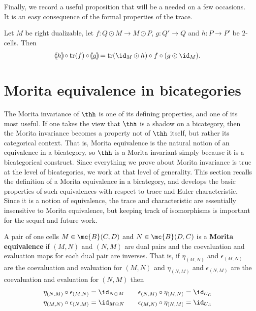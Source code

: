\documentclass[11pt]{amsart}
\DeclareMathOperator{\tr}{tr}
\def\shvar#1#2{{\ensuremath{%
  \hspace{1mm}\makebox[-1mm]{$#1\langle$}\makebox[0mm]{$#1\langle$}\hspace{1mm}%
  {#2}%
  \makebox[1mm]{$#1\rangle$}\makebox[0mm]{$#1\rangle$}%
}}}
\def\sh{\shvar{}}
\begin{document}
Finally, we record a useful proposition that will be a needed on a few occasions. It is an easy consequence of the formal properties of the trace. 

\begin{prop}\label{prop:tightening}\cite[Prop.~7.1]{ps:bicat} 
Let $M$ be right dualizable, let $f \colon  Q\odot M \to M \odot P$, $g\colon  Q' \to Q$ and $h\colon P \to P'$ be 2-cells. Then
\[
\sh{h}\circ \tr(f)\circ\sh{g}=\tr (\id_M \odot h)\circ f\circ (g\odot \id_M).
\]
\end{prop}

\section{Morita equivalence in bicategories}\label{morita_equivalence}

The Morita invariance of $\thh$ is one of its defining properties, and one of its most useful. If one takes the view that $\thh$ is a shadow on a bicategory, then the Morita invariance becomes a property not of $\thh$ itself, but rather its categorical context. That is, Morita equivalence is the natural notion of an equivalence in a bicategory, so $\thh$ is a Morita invariant simply because it is a bicategorical construct. Since everything we prove about Morita invariance is true at the level of bicategories, we work at that level of generality. This section recalls the definition of a Morita equivalence in a bicategory, and develops the basic properties of such equivalences with respect to trace and Euler characteristic. Since it is a notion of equivalence, the trace and characteristic are essentially insensitive to Morita equivalence, but keeping track of isomorphisms is important for the sequel and future work. 


\begin{defn}\label{defn:morita_equivalence}
A pair of one cells $M\in \mc{B}(C,D)$ and $N\in \mc{B}(D,C)$ is a {\bf Morita equivalence} if $(M,N)$ and $(N,M)$ are dual pairs and
the coevaluation and evaluation maps for each dual pair are inverses.  That is, if $\eta_{(M,N)}$ and $\epsilon_{(M,N)}$ are the coevaluation and evaluation 
for $(M,N)$ and $\eta_{(N,M)}$ and $\epsilon_{(N,M)}$ are the coevaluation and evaluation 
for $(N,M)$ then
\begin{align*}
 \eta_{(N,M)}\circ \epsilon_{(M,N)}=\id_{N\odot M} &\qquad \epsilon_{(N,M)}\circ \eta_{(M,N)}=\id_{U_{C}}
 \\
 \eta_{(M,N)}\circ \epsilon_{(N,M)}=\id_{M\odot N}&\qquad \epsilon_{(M,N)}\circ \eta_{(N,M)}=\id_{U_{{D}}}
\end{align*}
\end{defn}
\end{document}
